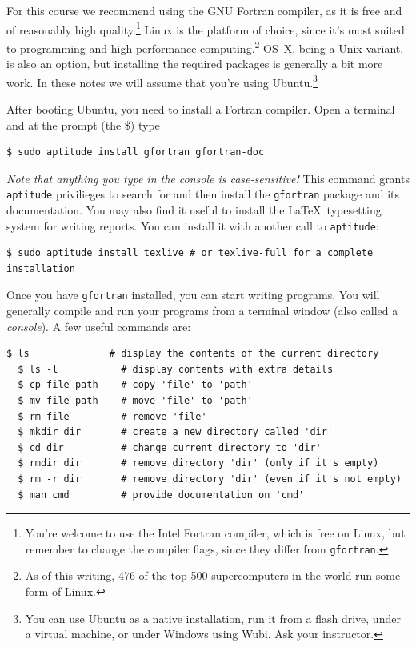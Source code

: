 \documentclass[openany,oneside]{report}
\begin{document}
For this course we recommend using the GNU Fortran compiler, as it is free and of reasonably high quality.\footnote{You're welcome to use the Intel Fortran compiler, which is free on Linux, but remember to change the compiler flags, since they differ from \texttt{gfortran}.} 
Linux is the platform of choice, since it's most suited to programming and high-performance computing.\footnote{As of this writing, 476 of the top 500 supercomputers in the world run some form of Linux.}
OS~X, being a Unix variant, is also an option, but installing the required packages is generally a bit more work.
In these notes we will assume that you're using Ubuntu.\footnote{You can use Ubuntu as a native installation, run it from a flash drive, under a virtual machine, or under Windows using Wubi.
Ask your instructor.}

After booting Ubuntu, you need to install a Fortran compiler.
Open a terminal and at the prompt (the \$) type
\begin{lstlisting}[style=prompt, nolol]
  $ sudo aptitude install gfortran gfortran-doc
\end{lstlisting}
\emph{Note that anything you type in the console is case-sensitive!} 
This command grants \texttt{aptitude} privilieges to search for and then install the \texttt{gfortran} package and its documentation.
You may also find it useful to install the \LaTeX\ typesetting system for writing reports.
You can install it with another call to \texttt{aptitude}:
\begin{lstlisting}[style=prompt, nolol]
  $ sudo aptitude install texlive # or texlive-full for a complete installation
\end{lstlisting}

Once you have \texttt{gfortran} installed, you can start writing programs.
You will generally compile and run your programs from a terminal window (also called a \emph{console}).
A few useful commands are:
\begin{lstlisting}[style=prompt, nolol]
  $ ls              # display the contents of the current directory
  $ ls -l           # display contents with extra details
  $ cp file path    # copy 'file' to 'path'
  $ mv file path    # move 'file' to 'path'
  $ rm file         # remove 'file'
  $ mkdir dir       # create a new directory called 'dir'
  $ cd dir          # change current directory to 'dir'
  $ rmdir dir       # remove directory 'dir' (only if it's empty)
  $ rm -r dir       # remove directory 'dir' (even if it's not empty)
  $ man cmd         # provide documentation on 'cmd'
\end{lstlisting}
\end{document}
